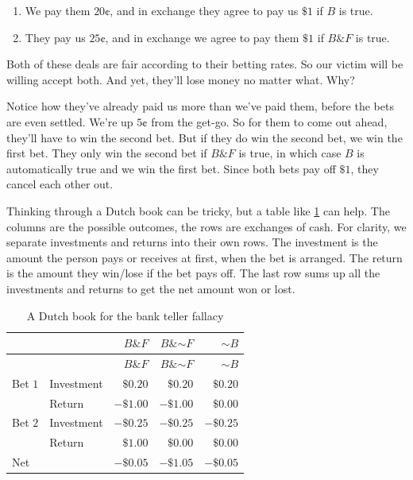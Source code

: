 \documentclass[justified]{tufte-book}
\providecommand{\tightlist}{%
  \setlength{\itemsep}{0pt}\setlength{\parskip}{0pt}}
\renewcommand{\neg}{\mathbin{\sim}}
\renewcommand{\wedge}{\mathbin{\&}}
\theoremstyle{definition}
\theoremstyle{definition}
\theoremstyle{definition}
\theoremstyle{definition}
\theoremstyle{remark}
\begin{document}
\begin{enumerate}
\def\labelenumi{\arabic{enumi}.}
\tightlist
\item
  We pay them \(20\)¢, and in exchange they agree to pay us \(\$1\) if \(B\) is true.
\item
  They pay us \(25\)¢, and in exchange we agree to pay them \(\$1\) if \(B \wedge F\) is true.
\end{enumerate}

Both of these deals are fair according to their betting rates. So our victim will be willing accept both. And yet, they'll lose money no matter what. Why?

Notice how they've already paid us more than we've paid them, before the bets are even settled. We're up \(5\)¢ from the get-go. So for them to come out ahead, they'll have to win the second bet. But if they do win the second bet, we win the first bet. They only win the second bet if \(B \wedge F\) is true, in which case \(B\) is automatically true and we win the first bet. Since both bets pay off \(\$1\), they cancel each other out.

Thinking through a Dutch book can be tricky, but a table like \ref{tab:banktellerdb} can help. The columns are the possible outcomes, the rows are exchanges of cash. For clarity, we separate investments and returns into their own rows. The investment is the amount the person pays or receives at first, when the bet is arranged. The return is the amount they win/lose if the bet pays off. The last row sums up all the investments and returns to get the net amount won or lost.

\begin{longtable}[]{@{}llrrr@{}}
\caption{\label{tab:banktellerdb}A Dutch book for the bank teller fallacy}\tabularnewline
\toprule
& & \(B \wedge F\) & \(B \wedge \neg F\) & \(\neg B\) \\
\midrule
\endfirsthead
\toprule
& & \(B \wedge F\) & \(B \wedge \neg F\) & \(\neg B\) \\
\midrule
\endhead
Bet \(1\) & Investment & \(\$0.20\) & \(\$0.20\) & \(\$0.20\) \\
& Return & \(-\$1.00\) & \(-\$1.00\) & \(\$0.00\) \\
Bet \(2\) & Investment & \(-\$0.25\) & \(-\$0.25\) & \(-\$0.25\) \\
& Return & \(\$1.00\) & \(\$0.00\) & \(\$0.00\) \\
Net & & \(-\$0.05\) & \(-\$1.05\) & \(-\$0.05\) \\
\bottomrule
\end{longtable}
\end{document}
